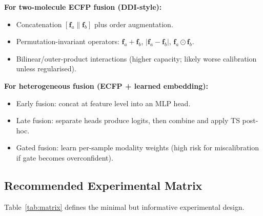 \documentclass[11pt,a4paper,twocolumn]{article}
\begin{document}
\textbf{For two-molecule ECFP fusion (DDI-style):}
\begin{itemize}
\item Concatenation $[\mathbf{f}_a \| \mathbf{f}_b]$ plus order
      augmentation.
\item Permutation-invariant operators: $\mathbf{f}_a+\mathbf{f}_b$,
      $|\mathbf{f}_a-\mathbf{f}_b|$,
      $\mathbf{f}_a\odot\mathbf{f}_b$.
\item Bilinear/outer-product interactions (higher capacity; likely worse
      calibration unless regularised).
\end{itemize}

\textbf{For heterogeneous fusion (ECFP + learned embedding):}
\begin{itemize}
\item Early fusion: concat at feature level into an MLP head.
\item Late fusion: separate heads produce logits, then combine and apply
      TS post-hoc.
\item Gated fusion: learn per-sample modality weights (high risk for
      miscalibration if gate becomes overconfident).
\end{itemize}

\subsection{Recommended Experimental Matrix}

Table~\ref{tab:matrix} defines the minimal but informative experimental
design.

\begin{table}[tp]
\centering
\caption{Experimental matrix for calibration evaluation.}
\label{tab:matrix}
\end{table}
\end{document}
